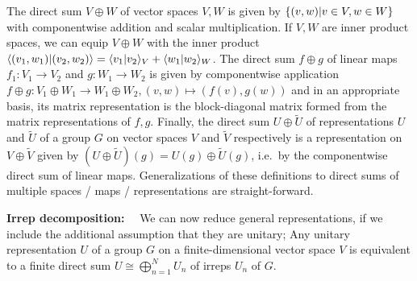 The direct sum $V \oplus W$ of vector spaces $V, W$ is given by $\setdef{(v, w)}{v\in V, w \in W}$ with componentwise addition and scalar multiplication.
%
If $V, W$ are inner product spaces, we can equip $V \oplus W$ with the inner product $\braket{(v_1, w_1)}{(v_2, w_2)} = \braket{v_1}{v_2}_V + \braket{w_1}{w_2}_W$.
%
The direct sum $f \oplus g$ of linear maps $f_1 : V_1 \to V_2$ and $g : W_1 \to W_2$ is given by componentwise application $f \oplus g : V_1 \oplus W_1 \to W_1 \oplus W_2 , (v, w) \mapsto (f(v), g(w))$ and in an appropriate basis, its matrix representation is the block-diagonal matrix formed from the matrix representations of $f, g$.
%
Finally, the direct sum $U \oplus \tilde{U}$ of representations $U$ and $\tilde U$ of a group $G$ on vector spaces $V$ and $\tilde V$ respectively is a representation on $V \oplus \tilde{V}$ given by $(U \oplus \tilde{U})(g) = U(g) \oplus \tilde{U}(g)$, i.e.~by the componentwise direct sum of linear maps.
%
Generalizations of these definitions to direct sums of multiple spaces / maps / representations are straight-forward.
    
\textbf{Irrep decomposition:}~~
We can now reduce general representations, if we include the additional assumption that they are unitary;
%
Any unitary representation $U$ of a group $G$ on a finite-dimensional vector space $V$ is equivalent to a finite direct sum $U \cong \bigoplus_{n=1}^N U_n$ of irreps $U_n$ of $G$.


